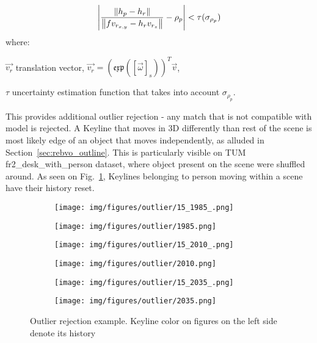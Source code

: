 \begin{equation}
\abs* {\frac{\norm*{h_p - h_r}}{\norm*{fv_{r_{x,y}}-h_{r}v_{r_z}} }-\rho_{p}} < \tau(\sigma_{\rho_{p}})
\label{eq:consistency}
\end{equation}
where:
\begin{eqwhere}[2cm]
	\item[$\vec{v_r}$] translation vector, $\vec{v_r} = \left( \mathfrak{exp} \left ( \left[ \vec{\omega} \right ]_{s} \right ) \right) ^T \vec{v}$,
	\item[$\tau$] uncertainty estimation function that takes into account $\sigma_{\rho_{p}}$.
\end{eqwhere}

This provides additional outlier rejection - any match that is not compatible with model is rejected. A Keyline that moves in 3D differently than rest of the scene is most likely edge of an object that moves independently, as alluded in Section~\ref{sec:rebvo_outline}. This is particularly visible on TUM fr2\_desk\_with\_person dataset, where object present on the scene were shuffled around. As seen on Fig.~\ref{fig:subfigure_outliers}, Keylines belonging to person moving within a scene have their history reset.

\begin{figure}[h]
	\centering
	\begin{subfigure}{0.35\textwidth}
		\centering\texttt{[image: img/figures/outlier/15\_1985\_.png]}
		\subcaption{\label{subfigure_a}}
	\end{subfigure}
	\begin{subfigure}{0.35\textwidth}
		\centering\texttt{[image: img/figures/outlier/1985.png]}
		\subcaption{\label{subfigure_a1}}
	\end{subfigure}
	\begin{subfigure}{0.35\textwidth}
		\centering\texttt{[image: img/figures/outlier/15\_2010\_.png]}
		\subcaption{\label{subfigure_b}}
	\end{subfigure}
	\begin{subfigure}{0.35\textwidth}
		\centering\texttt{[image: img/figures/outlier/2010.png]}
		\subcaption{\label{subfigure_b1}}
	\end{subfigure}
	\begin{subfigure}{0.35\textwidth}
		\centering\texttt{[image: img/figures/outlier/15\_2035\_.png]}
		\subcaption{\label{subfigure_c}}
	\end{subfigure}
	\begin{subfigure}{0.35\textwidth}
		\centering\texttt{[image: img/figures/outlier/2035.png]}
		\subcaption{\label{subfigure_c}}
	\end{subfigure}
	
	\caption{\label{fig:subfigure_outliers} Outlier rejection example. Keyline color on figures on the left side denote its history}
\end{figure}

